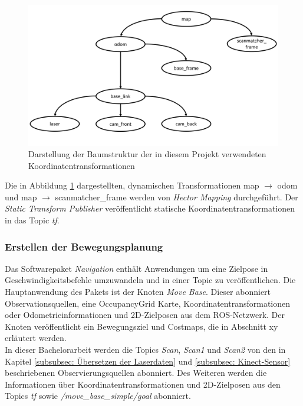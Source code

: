 		   		\begin{figure}[H]
		   			\centering
		   			\includegraphics[width=1.0\textwidth]{Bilder/frames}
		   			\caption{Darstellung der Baumstruktur der in diesem Projekt verwendeten Koordinatentransformationen}
		   			\label{fig: Baum der Koordinatentransformationen}
		   		\end{figure}
		      		    
		        Die in Abbildung \ref{fig: Baum der Koordinatentransformationen} dargestellten, dynamischen Transformationen map $\rightarrow$ odom und map $\rightarrow$ scanmatcher\_frame werden von \textit{Hector Mapping} durchgeführt. Der \textit{Static Transform Publisher} veröffentlicht statische Koordinatentransformationen in das Topic \textit{tf}. \cite{sttrpu}
		 			    
		 			    
		    \subsubsection*{Erstellen der Bewegungsplanung}
		    \label{subsubsec: Erstellen der Bewegungsplanung}
		    
		    	Das Softwarepaket \textit{Navigation} enthält Anwendungen um eine Zielpose in Geschwindigkeitsbefehle umzuwandeln und in einer Topic zu veröffentlichen. Die Hauptanwendung des Pakets ist der Knoten \textit{Move Base}. Dieser abonniert Observationsquellen, eine OccupancyGrid Karte, Koordinatentransformationen oder Odometrieinformationen und 2D-Zielposen aus dem ROS-Netzwerk. Der Knoten veröffentlicht ein Bewegungsziel und Costmaps, die in Abschnitt xy erläutert werden. \cite{navigation,movebase}\\ 
		    	
		    	In dieser Bachelorarbeit werden die Topics \textit{Scan}, \textit{Scan1} und \textit{Scan2} von den in Kapitel \ref{subsubsec: Übersetzen der Laserdaten} und \ref{subsubsec: Kinect-Sensor} beschriebenen Observierungsquellen abonniert. Des Weiteren werden die Informationen über Koordinatentransformationen und 2D-Zielposen aus den Topics \textit{tf} sowie \textit{/move\_base\_simple/goal} abonniert. 
		    	
